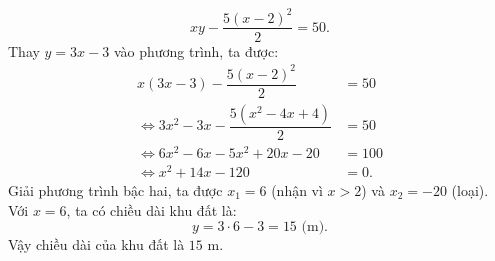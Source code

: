 \begin{bt}
{\begin{enumerate}[a)]
	$$xy - \dfrac{5(x - 2)^2}{2} = 50.$$
	Thay $y = 3x - 3$ vào phương trình, ta được:
	\begin{align*}
		x(3x - 3) - \dfrac{5(x - 2)^2}{2} &= 50 \\
		\iff 3x^2 - 3x - \dfrac{5(x^2 - 4x + 4)}{2} &= 50 \\
		\iff 6x^2 - 6x - 5x^2 + 20x - 20 &= 100 \\
		\iff x^2 + 14x - 120 &= 0.
	\end{align*}
	Giải phương trình bậc hai, ta được $x_1 = 6$ (nhận vì $x > 2$) và $x_2 = -20$ (loại).\\
	Với $x = 6$, ta có chiều dài khu đất là:
	$$y = 3 \cdot 6 - 3 = 15\text{ (m)}.$$
	Vậy chiều dài của khu đất là $15\text{ m}$.
\end{enumerate}
}
\end{bt}

